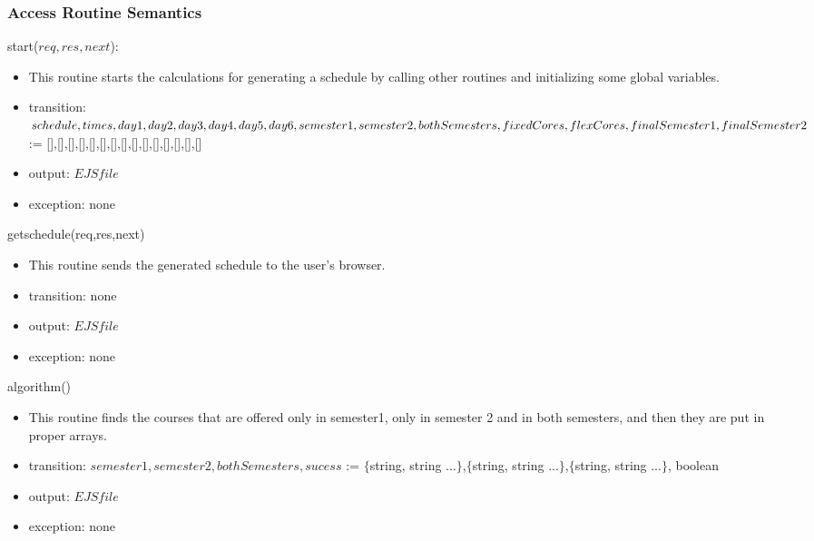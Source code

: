 \documentclass[11pt, oneside]{article}
\begin{document}
\subsubsection* {Access Routine Semantics}
start($req, res,next$):
\begin{itemize}
\item This routine starts the calculations for generating a schedule by calling other routines and initializing some global variables.
\item transition: $schedule,
    times,
    day1,
    day2,
    day3,
    day4,
    day5,
    day6, \newline
    semester1 ,
    semester2 ,
    bothSemesters ,
    fixedCores,
    flexCores,
    finalSemester1,
    finalSemester2 $ := [\hspace{0.2cm}],[\hspace{0.2cm}],[\hspace{0.2cm}],[\hspace{0.2cm}],[\hspace{0.2cm}],[\hspace{0.2cm}],[\hspace{0.2cm}],[\hspace{0.2cm}],[\hspace{0.2cm}],[\hspace{0.2cm}],[\hspace{0.2cm}],[\hspace{0.2cm}],[\hspace{0.2cm}],[\hspace{0.2cm}],[\hspace{0.2cm}]
\item output: $EJS file$
 \item exception: none
\end{itemize}


\noindent
getschedule(req,res,next)
\begin{itemize}
\item This routine sends the generated schedule to the user's browser.
\item transition: none
\item output: $EJS file$
 \item exception: none
\end{itemize}

\noindent
algorithm()
\begin{itemize}
\item This routine finds the courses that are offered only in semester1, only in semester 2 and in both semesters, and then they are put in proper arrays.
\item transition: $semester1, semester2, bothSemesters,sucess $ := $\{$string, string ...$\}$,$\{$string, string ...$\}$,$\{$string, string ...$\}$, boolean
\item output: $EJS file$
 \item exception: none
\end{itemize}
\end{document}
